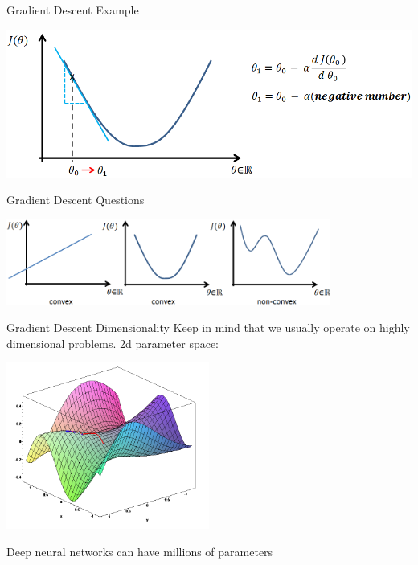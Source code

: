 \documentclass{beamer}
\begin{document}
\begin{frame}{Gradient Descent Example}
\begin{center}
\includegraphics[width=1.1\textwidth]{gd6}
\end{center}
\end{frame}


\begin{frame}{Gradient Descent Questions}
\begin{center}
\includegraphics[width=0.8\textwidth]{convexity}
\end{center}

\begin{itemize}
\end{itemize}
\end{frame}

\begin{frame}{Gradient Descent Dimensionality}
Keep in mind that we usually operate on highly dimensional problems. 2d parameter space:
\begin{center}
\includegraphics[width=0.5\textwidth]{gd_surface}
\end{center} \cite{WikiOverfitting}
Deep neural networks can have millions of parameters

\end{frame}
\end{document}
